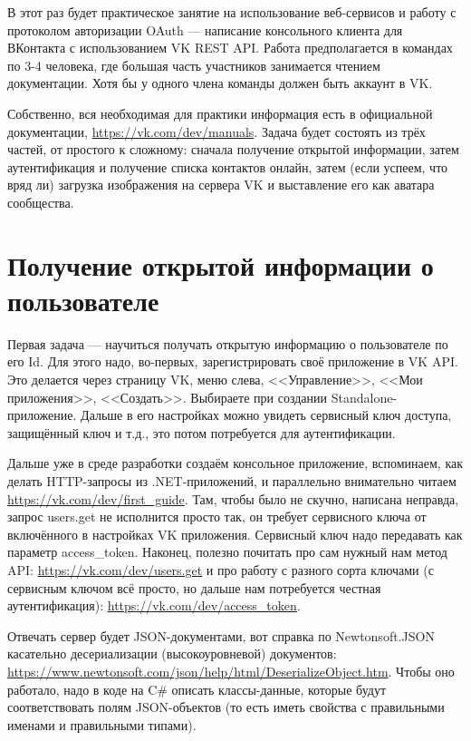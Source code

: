 \documentclass{../../text-style}
\begin{document}
\maketitle
\thispagestyle{empty}

В этот раз будет практическое занятие на использование веб-сервисов и работу с протоколом авторизации OAuth --- написание консольного клиента для ВКонтакта с использованием VK REST API. Работа предполагается в командах по 3-4 человека, где большая часть участников занимается чтением документации. Хотя бы у одного члена команды должен быть аккаунт в VK.

Собственно, вся необходимая для практики информация есть в официальной документации, \url{https://vk.com/dev/manuals}. Задача будет состоять из трёх частей, от простого к сложному: сначала получение открытой информации, затем аутентификация и получение списка контактов онлайн, затем (если успеем, что вряд ли) загрузка изображения на сервера VK и выставление его как аватара сообщества.

\section{Получение открытой информации о пользователе}

Первая задача --- научиться получать открытую информацию о пользователе по его Id. Для этого надо, во-первых, зарегистрировать своё приложение в VK API. Это делается через страницу VK, меню слева, <<Управление>>, <<Мои приложения>>, <<Создать>>. Выбираете при создании Standalone-приложение. Дальше в его настройках можно увидеть сервисный ключ доступа, защищённый ключ и т.д., это потом потребуется для аутентификации.

Дальше уже в среде разработки создаём консольное приложение, вспоминаем, как делать HTTP-запросы из .NET-приложений, и параллельно внимательно читаем \url{https://vk.com/dev/first_guide}. Там, чтобы было не скучно, написана неправда, запрос users.get не исполнится просто так, он требует сервисного ключа от включённого в настройках VK приложения. Сервисный ключ надо передавать как параметр access\_token. Наконец, полезно почитать про сам нужный нам метод API: \url{https://vk.com/dev/users.get} и про работу с разного сорта ключами (с сервисным ключом всё просто, но дальше нам потребуется честная аутентификация): \url{https://vk.com/dev/access_token}.

Отвечать сервер будет JSON-документами, вот справка по Newtonsoft.JSON касательно десериализации (высокоуровневой) документов: \url{https://www.newtonsoft.com/json/help/html/DeserializeObject.htm}. Чтобы оно работало, надо в коде на C\# описать классы-данные, которые будут соответствовать полям JSON-объектов (то есть иметь свойства с правильными именами и правильными типами).
\end{document}
